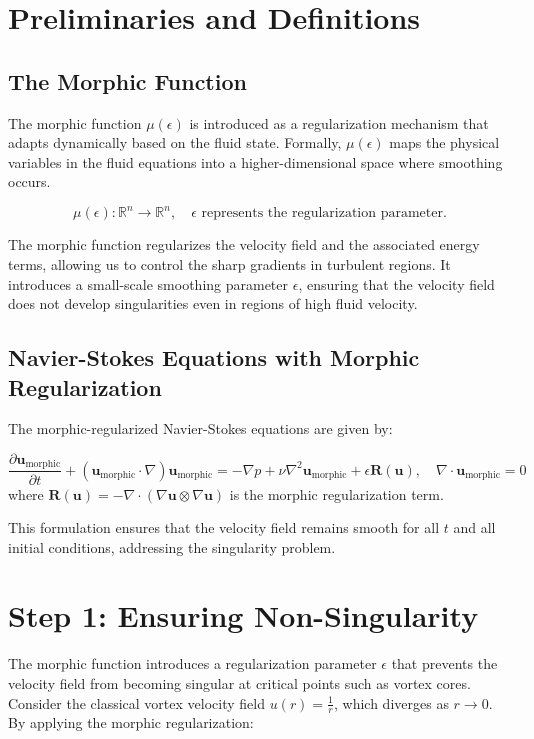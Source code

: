 \documentclass{article}
\begin{document}
\section*{Preliminaries and Definitions}

\subsection*{The Morphic Function}

The morphic function \( \mu(\epsilon) \) is introduced as a regularization mechanism that adapts dynamically based on the fluid state. Formally, \( \mu(\epsilon) \) maps the physical variables in the fluid equations into a higher-dimensional space where smoothing occurs.

\[
\mu(\epsilon) : \mathbb{R}^n \to \mathbb{R}^n, \quad \epsilon \text{ represents the regularization parameter.}
\]

The morphic function regularizes the velocity field and the associated energy terms, allowing us to control the sharp gradients in turbulent regions. It introduces a small-scale smoothing parameter \( \epsilon \), ensuring that the velocity field does not develop singularities even in regions of high fluid velocity.

\subsection*{Navier-Stokes Equations with Morphic Regularization}

The morphic-regularized Navier-Stokes equations are given by:

\[
\frac{\partial \mathbf{u}_{\text{morphic}}}{\partial t} + (\mathbf{u}_{\text{morphic}} \cdot \nabla) \mathbf{u}_{\text{morphic}} = -\nabla p + \nu \nabla^2 \mathbf{u}_{\text{morphic}} + \epsilon \mathbf{R}(\mathbf{u}), \quad \nabla \cdot \mathbf{u}_{\text{morphic}} = 0
\]
where \( \mathbf{R}(\mathbf{u}) = -\nabla \cdot (\nabla \mathbf{u} \otimes \nabla \mathbf{u}) \) is the morphic regularization term.

This formulation ensures that the velocity field remains smooth for all \( t \) and all initial conditions, addressing the singularity problem.

\section*{Step 1: Ensuring Non-Singularity}

The morphic function introduces a regularization parameter \( \epsilon \) that prevents the velocity field from becoming singular at critical points such as vortex cores. Consider the classical vortex velocity field \( u(r) = \frac{1}{r} \), which diverges as \( r \to 0 \). By applying the morphic regularization:
\end{document}
